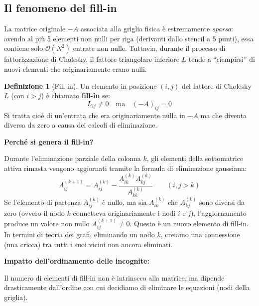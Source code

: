 \documentclass[a4paper,11pt]{article}
\theoremstyle{definition}
\newtheorem{definizione}{Definizione}[section]
\begin{document}
\subsection{Il fenomeno del fill-in}

La matrice originale $-A$ associata alla griglia fisica è estremamente \emph{sparsa}: avendo al più 5 elementi non nulli per riga (derivanti dallo stencil a 5 punti), essa contiene solo $\mathcal{O}(N^2)$ entrate non nulle. Tuttavia, durante il processo di fattorizzazione di Cholesky, il fattore triangolare inferiore $L$ tende a ``riempirsi'' di nuovi elementi che originariamente erano nulli.

\begin{definizione}[Fill-in]
Un elemento in posizione $(i,j)$ del fattore di Cholesky $L$ (con $i > j$) è chiamato \textbf{fill-in} se:
\[
  L_{ij} \neq 0 \quad \text{ma} \quad (-A)_{ij} = 0
\]
Si tratta cioè di un'entrata che era originariamente nulla in $-A$ ma che diventa diversa da zero a causa dei calcoli di eliminazione.
\end{definizione}

\noindent\textbf{Perché si genera il fill-in?}

Durante l'eliminazione parziale della colonna $k$, gli elementi della sottomatrice attiva rimasta vengono aggiornati tramite la formula di eliminazione gaussiana:
\[
  A_{ij}^{(k+1)} = A_{ij}^{(k)} - \frac{A_{ik}^{(k)} A_{kj}^{(k)}}{A_{kk}^{(k)}} \qquad (i, j > k)
\]
Se l'elemento di partenza $A_{ij}^{(k)}$ è nullo, ma sia $A_{ik}^{(k)}$ che $A_{kj}^{(k)}$ sono diversi da zero (ovvero il nodo $k$ connetteva originariamente i nodi $i$ e $j$), l'aggiornamento produce un valore non nullo $A_{ij}^{(k+1)} \neq 0$. Questo è un nuovo elemento di fill-in. In termini di teoria dei grafi, eliminando un nodo $k$, creiamo una connessione (una cricca) tra tutti i suoi vicini non ancora eliminati.

\bigskip
\noindent\textbf{Impatto dell'ordinamento delle incognite:}

Il numero di elementi di fill-in non è intrinseco alla matrice, ma dipende drasticamente dall'ordine con cui decidiamo di eliminare le equazioni (nodi della griglia). 
\end{document}

